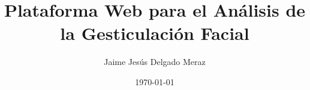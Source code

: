 \documentclass[spanish,ESP,MSc]{cinvestav} %
\title{Plataforma Web para el Análisis de la Gesticulación Facial}
\author{Jaime Jesús Delgado Meraz}
\date{\today}
\begin{document}
\makeintropages


\begin{doublespace}


%

%

%

%

%

%

\end{doublespace}

\appendix

\begin{doublespace}

%

%

%

\end{doublespace}
\end{document}
